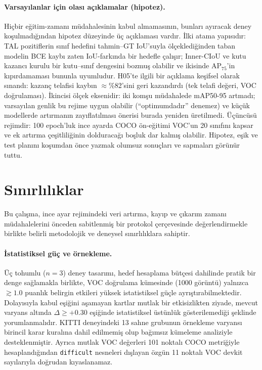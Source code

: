 \documentclass[pdflatex,iicol,sn-mathphys-num]{sn-jnl}
\begin{document}
\paragraph{Varsayılanlar için olası açıklamalar (hipotez).}
Hiçbir eğitim-zamanı müdahalesinin kabul almamasının, bunları ayıracak deney koşulmadığından hipotez düzeyinde üç açıklaması vardır. İlki atama yapısıdır: TAL pozitiflerin sınıf hedefini tahmin--GT IoU'suyla ölçeklediğinden \cite{feng_2021_tood} taban modelin BCE kaybı zaten IoU-farkında bir hedefle çalışır; Inner-CIoU ve kutu kazancı kurulu bir kutu--sınıf dengesini bozmuş olabilir ve ikisinde AP$_{75}$'in kıpırdamaması bununla uyumludur. H05'te ilgili bir açıklama keşifsel olarak sınandı: kazanç telafisi kaybın $\approx$\%82'sini geri kazandırdı (tek telafi değeri, VOC doğrulaması). İkincisi ölçek eksenidir: iki komşu müdahalede mAP50-95 artmadı; varsayılan genlik bu rejime uygun olabilir (``optimumdadır'' denemez) ve küçük modellerde artırmanın zayıflatılması önerisi \cite{ge_2021_yolox} burada yeniden üretilmedi. Üçüncüsü rejimdir: 100 epoch'luk ince ayarda COCO ön-eğitimi VOC'un 20 sınıfını kapsar \cite{lin_2014_coco} ve ek artırma çeşitliliğinin dolduracağı boşluk dar kalmış olabilir. Hipotez, eşik ve test planını koşumdan önce yazmak \cite{nosek_2018_preregistration} olumsuz sonuçları ve sapmaları görünür tuttu.

\section{Sınırlılıklar}\label{sec:sinirliliklar}

Bu çalışma, ince ayar rejimindeki veri artırma, kayıp ve çıkarım zamanı müdahalelerini önceden sabitlenmiş bir protokol çerçevesinde değerlendirmekle birlikte belirli metodolojik ve deneysel sınırlılıklara sahiptir.

\paragraph{İstatistiksel güç ve örnekleme.}
Üç tohumlu ($n=3$) deney tasarımı, hedef hesaplama bütçesi dahilinde pratik bir denge sağlamakla birlikte, VOC doğrulama kümesinde (1000 görüntü) yalnızca $\gtrsim 1.0$ puanlık belirgin etkileri yüksek istatistiksel güçle ayrıştırabilmektedir. Dolayısıyla kabul eşiğini aşamayan kartlar mutlak bir etkisizlikten ziyade, mevcut varyans altında $\Delta \ge +0.30$ eşiğinde istatistiksel üstünlük gösterilemediği şeklinde yorumlanmalıdır. KITTI deneyindeki 13 sahne grubunun örnekleme varyansı birincil karar kuralına dahil edilmemiş olup bağımsız kümeleme analiziyle desteklenmiştir. Ayrıca mutlak VOC değerleri 101 noktalı COCO metriğiyle hesaplandığından \texttt{difficult} nesneleri dışlayan özgün 11 noktalı VOC devkit sayılarıyla \cite{everingham_2010_voc} doğrudan kıyaslanamaz.
\end{document}

